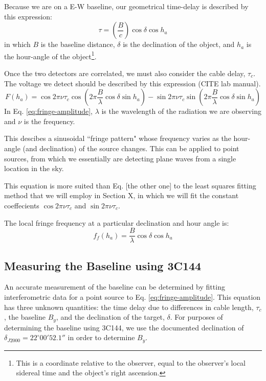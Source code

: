 \documentclass[12pt]{article}
\begin{document}
Because we are on a E-W baseline, our geometrical time-delay is described by this expression:
\begin{equation}
\tau = \left( \frac{B}{c} \right) \cos{\delta} \cos{h_a}
\end{equation}
in which $B$ is the baseline distance, $\delta$ is the declination of the object, and $h_a$ is the hour-angle of the object\footnote{This is a coordinate relative to the observer, equal to the observer's local sidereal time and the object's right ascension.}.

Once the two detectors are correlated, we must also consider the cable delay, $\tau_c$. The voltage we detect should be described by this expression (CITE lab manual).
\begin{equation}
F(h_a) = \cos{2\pi \nu \tau_c} \cos{\left( 2\pi \frac{B}{\lambda} 
\cos{\delta} \sin{h_a} \right)} - \sin{2\pi \nu \tau_c} \sin{\left( 2\pi \frac{B}{\lambda} 
\cos{\delta} \sin{h_a} \right)} \label{eq:fringe-amplitude}
\end{equation}
In Eq. \ref{eq:fringe-amplitude}, $\lambda$ is the wavelength of the radiation we are observing and $\nu$ is the frequency. 

This descibes a sinusoidal ``fringe pattern" whose frequency varies as the hour-angle (and declination) of the source changes. This can be applied to point sources, from which we essentially are detecting plane waves from a single location in the sky.

This equation is more suited than Eq. [the other one]  to the least squares fitting method that we will employ in Section X, in which we will fit the constant coeffecients $ \cos{2\pi \nu \tau_c}$ and $ \sin{2\pi \nu \tau_c}$.

The local fringe frequency at a particular declination and hour angle is:
\begin{equation}
f_f(h_a) = \frac{B}{\lambda} \cos{\delta} \cos{h_a} \label{eq:local-fringe-frequency}
\end{equation}

\subsection{Measuring the Baseline using 3C144}
An accurate measurement of the baseline can be determined by fitting interferometric data for a point source  to Eq. \ref{eq:fringe-amplitude}. This equation has three unknown quantities: the time delay due to differences in cable length, $\tau_c$, the baseline $B_y$, and the declination of the target, $\delta$. For purposes of determining the baseline using 3C144, we use the documented declination of $\delta_{J2000} = 22^\circ 00'52.1''$ in order to determine $B_y$.
\end{document}
